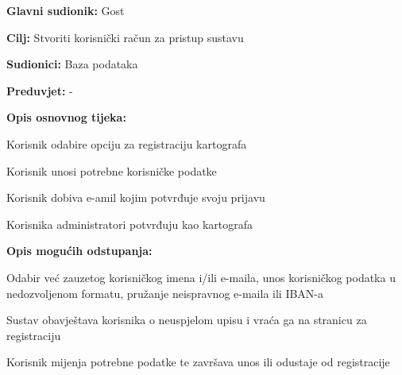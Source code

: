 					\noindent {}
					\begin{packed_item}
	
						\item \textbf{Glavni sudionik: }Gost
						\item  \textbf{Cilj:} Stvoriti korisnički račun za pristup sustavu
						\item  \textbf{Sudionici:} Baza podataka
						\item  \textbf{Preduvjet:} -
						\item  \textbf{Opis osnovnog tijeka:}
						
						\item[] \begin{packed_enum}
	
							\item Korisnik odabire opciju za registraciju kartografa
							\item Korisnik unosi potrebne korisničke podatke
							\item Korisnik dobiva e-amil kojim potvrđuje svoju prijavu
							\item Korisnika administratori potvrđuju kao kartografa

						\end{packed_enum}
						
						\item  \textbf{Opis mogućih odstupanja:}
						
						\item[] \begin{packed_item}
	
							\item[2.a] Odabir već zauzetog korisničkog imena i/ili e-maila, unos korisničkog podatka u nedozvoljenom formatu, pružanje neispravnog e-maila ili IBAN-a
							\item[] \begin{packed_enum}
								
								\item Sustav obavještava korisnika o neuspjelom upisu i vraća ga na stranicu za registraciju
								\item Korisnik mijenja potrebne podatke te završava unos ili odustaje od registracije
								
							\end{packed_enum}
							
						\end{packed_item}
					\end{packed_item}
				
